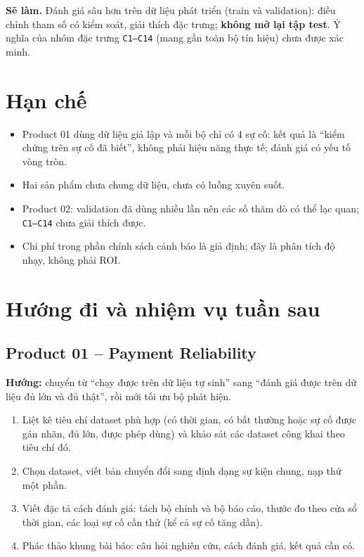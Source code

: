 \documentclass[11pt,a4paper]{article}
\begin{document}
\textbf{Sẽ làm.} Đánh giá sâu hơn trên dữ liệu phát triển (train và validation): điều chỉnh tham số có
kiểm soát, giải thích đặc trưng; \textbf{không mở lại tập test}. Ý nghĩa của nhóm đặc trưng \texttt{C1–C14}
(mang gần toàn bộ tín hiệu) chưa được xác minh.

\section{Hạn chế}

\begin{itemize}
  \item Product 01 dùng dữ liệu giả lập và mỗi bộ chỉ có 4 sự cố: kết quả là “kiểm chứng trên sự cố đã
        biết”, không phải hiệu năng thực tế; đánh giá có yếu tố vòng tròn.
  \item Hai sản phẩm chưa chung dữ liệu, chưa có luồng xuyên suốt.
  \item Product 02: validation đã dùng nhiều lần nên các số thăm dò có thể lạc quan; \texttt{C1–C14} chưa
        giải thích được.
  \item Chi phí trong phần chính sách cảnh báo là giả định; đây là phân tích độ nhạy, không phải ROI.
\end{itemize}

\section{Hướng đi và nhiệm vụ tuần sau}

\subsection*{Product 01 – Payment Reliability}

\textbf{Hướng:} chuyển từ “chạy được trên dữ liệu tự sinh” sang “đánh giá được trên dữ liệu đủ lớn và
đủ thật”, rồi mới tối ưu bộ phát hiện.
\begin{enumerate}
  \item Liệt kê tiêu chí dataset phù hợp (có thời gian, có bất thường hoặc sự cố được gán nhãn, đủ lớn,
        được phép dùng) và khảo sát các dataset công khai theo tiêu chí đó.
  \item Chọn dataset, viết bản chuyển đổi sang định dạng sự kiện chung, nạp thử một phần.
  \item Viết đặc tả cách đánh giá: tách bộ chỉnh và bộ báo cáo, thước đo theo cửa sổ thời gian, các loại
        sự cố cần thử (kể cả sự cố tăng dần).
  \item Phác thảo khung bài báo: câu hỏi nghiên cứu, cách đánh giá, kết quả cần có.
\end{enumerate}
\end{document}
